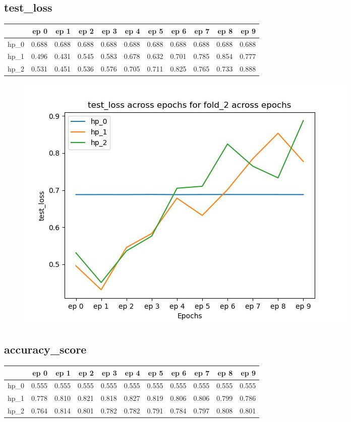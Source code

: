\documentclass{article}
\begin{document}
\subsection{test\_loss}
\begin{tabular}{lrrrrrrrrrr}
\toprule
{} &   ep 0 &   ep 1 &   ep 2 &   ep 3 &   ep 4 &   ep 5 &   ep 6 &   ep 7 &   ep 8 &   ep 9 \\
\midrule
hp\_0 &  0.688 &  0.688 &  0.688 &  0.688 &  0.688 &  0.688 &  0.688 &  0.688 &  0.688 &  0.688 \\
hp\_1 &  0.496 &  0.431 &  0.545 &  0.583 &  0.678 &  0.632 &  0.701 &  0.785 &  0.854 &  0.777 \\
hp\_2 &  0.531 &  0.451 &  0.536 &  0.576 &  0.705 &  0.711 &  0.825 &  0.765 &  0.733 &  0.888 \\
\bottomrule
\end{tabular}

\begin{figure}[H]
\includegraphics[scale = 0.75]{fold_2/test_loss}
\end{figure}
\subsection{accuracy\_score}
\begin{tabular}{lrrrrrrrrrr}
\toprule
{} &   ep 0 &   ep 1 &   ep 2 &   ep 3 &   ep 4 &   ep 5 &   ep 6 &   ep 7 &   ep 8 &   ep 9 \\
\midrule
hp\_0 &  0.555 &  0.555 &  0.555 &  0.555 &  0.555 &  0.555 &  0.555 &  0.555 &  0.555 &  0.555 \\
hp\_1 &  0.778 &  0.810 &  0.821 &  0.818 &  0.827 &  0.819 &  0.806 &  0.806 &  0.799 &  0.786 \\
hp\_2 &  0.764 &  0.814 &  0.801 &  0.782 &  0.782 &  0.791 &  0.784 &  0.797 &  0.808 &  0.801 \\
\bottomrule
\end{tabular}
\end{document}
